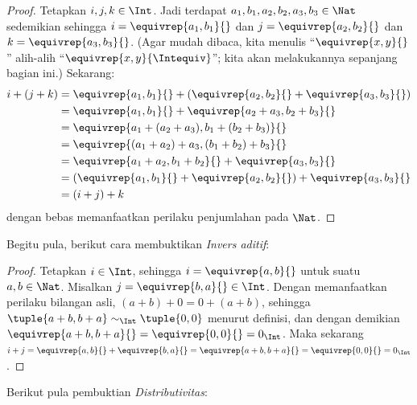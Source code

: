 \documentclass[../../../include/open-logic-section]{subfiles}
\begin{document}
\begin{proof} 
Tetapkan $i, j, k \in \Int$. Jadi terdapat $a_1, b_1, a_2, b_2, a_3, b_3 \in
\Nat$ sedemikian sehingga $i = \equivrep{a_1, b_1}{}$ dan $j =
\equivrep{a_2,b_2}{}$ dan $k = \equivrep{a_3, b_3}{}$. (Agar mudah dibaca,
kita menulis ``$\equivrep{x, y}{}$'' alih-alih
``$\equivrep{x, y}{\Intequiv}$''; kita akan melakukannya sepanjang
bagian ini.) Sekarang:
\begin{align*}
	i + (j + k) &= \equivrep{a_1, b_1}{}+(\equivrep{a_2, b_2}{} + \equivrep{a_3, b_3}{}) \\
	&= \equivrep{a_1,  b_1}{} + \equivrep{a_2+a_3, b_2+b_3}{}\\
	&= \equivrep{a_1 + (a_2 + a_3), b_1 + (b_2 + b_3)}{}\\
	&= \equivrep{(a_1 + a_2) + a_3, (b_1 + b_2) + b_3}{}\\
	&= \equivrep{a_1 + a_2, b_1 + b_2}{} + \equivrep{a_3, b_3}{}\\
	&= (\equivrep{a_1, b_1}{} + \equivrep{a_2, b_2}{}) + \equivrep{a_3, b_3}{}\\
	&= (i+j) + k
\end{align*}
dengan bebas memanfaatkan perilaku penjumlahan pada $\Nat$.
\end{proof}

Begitu pula, berikut cara membuktikan \emph{Invers aditif}:

\begin{proof}
Tetapkan $i \in \Int$, sehingga $i = \equivrep{a,b}{}$ untuk suatu $a,b \in
\Nat$. Misalkan $j = \equivrep{b,a}{} \in \Int$. Dengan memanfaatkan
perilaku bilangan asli, $(a+b) + 0 = 0 + (a+b)$, sehingga
$\tuple{a+b, b+a} \sim_\Int \tuple{0,0}$ menurut definisi, dan dengan demikian
$\equivrep{a+b, b+a}{} = \equivrep{0, 0}{} = 0_\Int$. Maka sekarang $i + j =
\equivrep{a,b}{}+\equivrep{b,a}{}=\equivrep{a+b, b+a}{}= \equivrep{0,
0}{} = 0_\Int$.
\end{proof}

Berikut pula pembuktian \emph{Distributivitas}:
\end{document}
